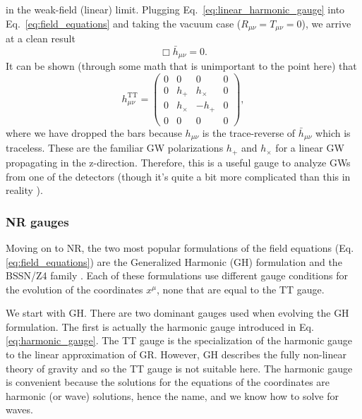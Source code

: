 \begin{bibunit}[unsrtnat]
in the weak-field (linear) limit\cite{Carroll:2004st}. Plugging Eq.~\ref{eq:linear_harmonic_gauge}
into Eq.~\ref{eq:field_equations} and taking the vacuum case ($R_{\mu\nu} =
T_{\mu\nu} = 0$), we arrive at a clean result
\begin{equation}
  \Box \bar{h}_{\mu\nu} = 0 .
\end{equation}
It can be shown (through some math that is unimportant to the point here)
\cite{Carroll:2004st} that
\begin{equation}
  h^{\textrm{TT}}_{\mu\nu} = \left(
\begin{matrix}
  0 & 0 & 0 & 0 \\
  0 & h_{+} & h_{\times} & 0 \\
  0 & h_{\times} & -h_{+} & 0 \\
  0 & 0 & 0 & 0
\end{matrix}
\right) ,
\end{equation}
where we have dropped the bars because $h_{\mu\nu}$ is the trace-reverse of
$\bar{h}_{\mu\nu}$ which is traceless. These are the familiar GW polarizations
$h_{+}$ and $h_{\times}$ for a linear GW propagating in the z-direction.
Therefore, this is a useful gauge to analyze GWs from one of the detectors
(though it's quite a bit more complicated than this in reality
\cite{KAGRA:2021vkt,LIGOScientific:2021usb,LIGOScientific:2020ibl,LIGOScientific:2018mvr}).

\subsubsection{NR gauges}

Moving on to NR, the two most popular formulations of the field equations (Eq.
\ref{eq:field_equations}) are the Generalized Harmonic (GH) formulation
\cite{Garfinkle:2001ni,Lindblom:2005qh} and the BSSN/Z4 family
\cite{Nakamura:1987zz,Shibata:1995we,Baumgarte:1998te,Bona:2003fj,Bernuzzi:2009ex,Hilditch:2012fp,Alic:2011gg}.
Each of these
formulations use different gauge conditions for the evolution of the coordinates
$x^\mu$, none that are equal to the TT gauge.

We start with GH. There are two dominant gauges used when evolving the GH
formulation. The first is actually the harmonic gauge introduced in Eq.
\ref{eq:harmonic_gauge}. The TT gauge is the specialization of the harmonic
gauge to the linear approximation of GR. However, GH describes the fully
non-linear theory of gravity and so the TT gauge is not suitable here. The
harmonic gauge is convenient because the solutions for the equations of the
coordinates are harmonic (or wave) solutions, hence the name, and we know how to
solve for waves.


\end{bibunit}
